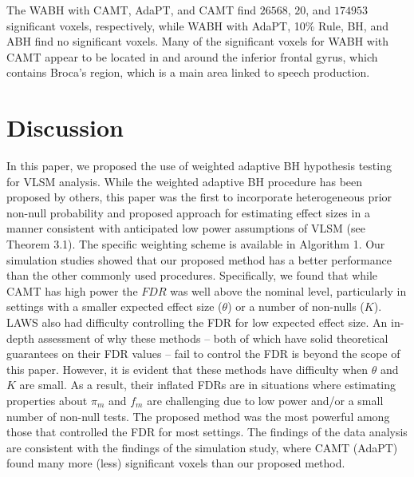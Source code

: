 \documentclass[bimj,fleqn]{w-art}
\theoremstyle{plain}
\theoremstyle{definition}
\begin{document}
The WABH with CAMT, AdaPT, and CAMT find $26568$, $20$, and $174953$ significant voxels, respectively, while WABH with AdaPT, 10\% Rule, BH, and ABH find no significant voxels. Many of the significant voxels for WABH with CAMT appear to be located in and around the inferior frontal gyrus, which contains Broca's region, which is a main area linked to speech production.


\section{Discussion}\label{sec.disc}


In this paper, we proposed the use of weighted adaptive BH hypothesis testing for VLSM analysis. While the weighted adaptive BH procedure has been proposed by others, this paper was the first to incorporate heterogeneous prior non-null probability and proposed approach for estimating effect sizes in a manner consistent with anticipated low power assumptions of VLSM (see Theorem 3.1). The specific weighting scheme is available in Algorithm 1. Our simulation studies showed that our proposed method has a better performance than the other commonly used procedures. Specifically, we found that while CAMT has high power the $FDR$ was well above the nominal level, particularly in settings with a smaller expected effect size ($\theta$) or a number of non-nulls ($K$). LAWS also had difficulty controlling the FDR for low expected effect size. An in-depth assessment of why these methods -- both of which have solid theoretical guarantees on their FDR values -- fail to control the FDR is beyond the scope of this paper. However, it is evident that these methods have difficulty when $\theta$ and $K$ are small. As a result, their inflated FDRs are in situations where estimating properties about $\pi_m$ and $f_m$ are challenging due to low power and/or a small number of non-null tests. The proposed method was the most powerful among those that controlled the FDR for most settings. The findings of the data analysis are consistent with the findings of the simulation study, where CAMT (AdaPT) found many more (less) significant voxels than our proposed method.
\end{document}
